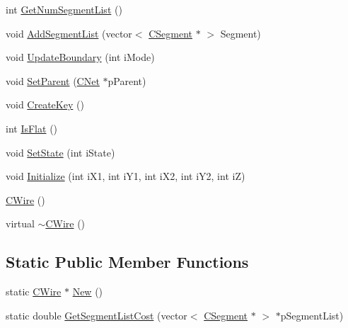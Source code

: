 \begin{DoxyCompactItemize}
\item 
int \mbox{\hyperlink{classCWire_a715cef9442c9cc6b45259c7291b84209}{Get\+Num\+Segment\+List}} ()
\item 
void \mbox{\hyperlink{classCWire_a4e6880d10696889c8f5f65bc628984c5}{Add\+Segment\+List}} (vector$<$ \mbox{\hyperlink{classCSegment}{C\+Segment}} $\ast$ $>$ Segment)
\item 
void \mbox{\hyperlink{classCWire_a2f7cf29379c4f0a57e0c08e321cb25a2}{Update\+Boundary}} (int i\+Mode)
\item 
void \mbox{\hyperlink{classCWire_a5eecb0e93a2609930901b265ed4fc3de}{Set\+Parent}} (\mbox{\hyperlink{classCNet}{C\+Net}} $\ast$p\+Parent)
\item 
void \mbox{\hyperlink{classCWire_a6ed15ca71f29273eed927d88c87535b0}{Create\+Key}} ()
\item 
int \mbox{\hyperlink{classCWire_a94140b0fd930f03e8a4a5a2988469987}{Is\+Flat}} ()
\item 
void \mbox{\hyperlink{classCWire_aa21e8506c023f4c32481eaccdfeccc2e}{Set\+State}} (int i\+State)
\item 
void \mbox{\hyperlink{classCWire_ab32c9734c1bb70f9aecb90be922d63fe}{Initialize}} (int i\+X1, int i\+Y1, int i\+X2, int i\+Y2, int iZ)
\item 
\mbox{\hyperlink{classCWire_aaedab9ea265619eef584b208c675fdd3}{C\+Wire}} ()
\item 
virtual \mbox{\hyperlink{classCWire_add9cbb4215373042a505db6330fbcb6c}{$\sim$\+C\+Wire}} ()
\end{DoxyCompactItemize}
\subsection*{Static Public Member Functions}
\begin{DoxyCompactItemize}
\item 
static \mbox{\hyperlink{classCWire}{C\+Wire}} $\ast$ \mbox{\hyperlink{classCWire_ad3c0d423ef6dc81227d3e16803b1cf17}{New}} ()
\item 
static double \mbox{\hyperlink{classCWire_a1ae9fcc1cce6786baafc20dd4adb27c0}{Get\+Segment\+List\+Cost}} (vector$<$ \mbox{\hyperlink{classCSegment}{C\+Segment}} $\ast$ $>$ $\ast$p\+Segment\+List)
\end{DoxyCompactItemize}

